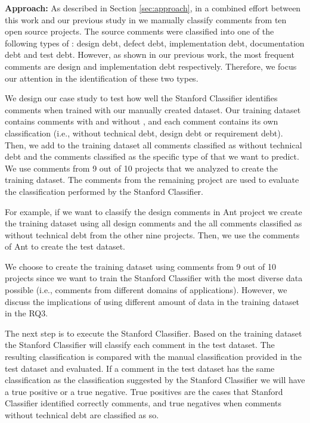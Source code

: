 \vspace{1mm}
\noindent \textbf{Approach:} As described in Section \ref{sec:approach}, in a combined effort between this work and our previous study in \SATD \cite{Maldonado2015MTD} we manually classify comments from ten open source projects. The source comments were classified into one of the following types of \SATD: design debt, defect debt, implementation debt, documentation debt and test debt. However, as shown in our previous work, the most frequent \SATD comments are design and implementation debt respectively. Therefore, we focus our attention in the identification of these two \SATD types. 

We design our case study to test how well the Stanford Classifier identifies \SATD comments when trained with our manually created dataset. Our training dataset contains comments with and without \SATD, and each comment contains its own classification (i.e., without technical debt, design debt or requirement debt). Then, we add to the training dataset all comments classified as without technical debt and the comments classified as the specific type of \SATD that we want to predict. We use comments from 9 out of 10 projects that we analyzed to create the training dataset. The comments from the remaining project are used to evaluate the classification performed by the Stanford Classifier. 

For example, if we want to classify the design \SATD comments in Ant project we create the training dataset using all design \SATD comments and the all comments classified as without technical debt from the other nine projects. Then, we use the comments of Ant to create the test dataset. 

We choose to create the training dataset using comments from 9 out of 10 projects since we want to train the Stanford Classifier with the most diverse data possible (i.e., comments from different domains of applications). However, we discuss the implications of using different amount of data in the training dataset in the RQ3.

The next step is to execute the Stanford Classifier. Based on the training dataset the Stanford Classifier will classify each comment in the test dataset. The resulting classification is compared with the manual classification provided in the test dataset and evaluated. If a comment in the test dataset has the same classification as the classification suggested by the Stanford Classifier we will have a true positive or a true negative. True positives are the cases that Stanford Classifier identified correctly \SATD comments, and true negatives when comments without technical debt are classified as so. 

